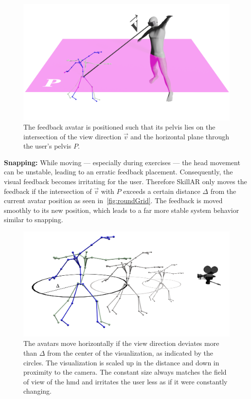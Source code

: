 \begin{figure}[h!]
	\centering
	\includegraphics[width=0.6\linewidth]{pictures/avatarPos.png}
	\caption{The feedback avatar is positioned such that its pelvis lies on the intersection of the view direction $\vec{v}$ and the horizontal plane through the user's pelvis $P$.\label{fig:positioning}}
\end{figure}

\textbf{Snapping:}
While moving --- especially during exercises --- the head movement can be unstable, leading to an erratic feedback placement. Consequently, the visual feedback becomes irritating for the user. Therefore SkillAR only moves the feedback if the intersection of $\vec{v}$ with $P$ exceeds a certain distance $\Delta$ from the current avatar position as seen in~\autoref{fig:roundGrid}. The feedback is moved smoothly to its new position, which leads to a far more stable system behavior similar to snapping.

\begin{figure}[h!]
	\centering
	\includegraphics[width=0.6\linewidth]{pictures/gridRound.png}
	\caption{The avatars move horizontally if the view direction deviates more than $\Delta$ from the center of the visualization, as indicated by the circles. The visualization is scaled up in the distance and down in proximity to the camera. The constant size always matches the field of view of the \acrshort{hmd} and irritates the user less as if it were constantly changing.\label{fig:roundGrid}}
\end{figure}


